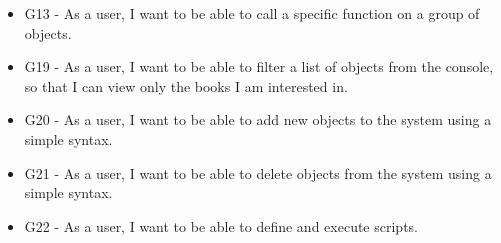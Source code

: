 \begin{itemize}
\item G13 - As a user, I want to be able to call a specific function on a group of objects.
\item G19 - As a user, I want to be able to filter a list of objects from the console, so that I can view only the books I am interested in.
\item G20 - As a user, I want to be able to add new objects to the system using a simple syntax.
\item G21 - As a user, I want to be able to delete objects from the system using a simple syntax.
\item G22 - As a user, I want to be able to define and execute scripts.
\end{itemize}

